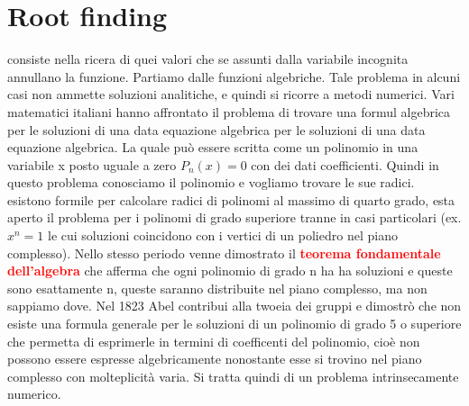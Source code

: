 \section{Root finding}
consiste nella ricera di quei valori che se assunti dalla variabile incognita annullano la funzione. Partiamo dalle funzioni algebriche. Tale problema in alcuni casi non ammette soluzioni analitiche, e quindi si ricorre a metodi numerici. Vari matematici italiani hanno affrontato il problema di trovare una formul algebrica per le soluzioni di una data equazione algebrica per le soluzioni di una data equazione algebrica. La quale può essere scritta come un polinomio in una variabile x posto uguale a zero $P_n(x)=0$ con dei dati coefficienti.
Quindi in questo problema conosciamo il polinomio e vogliamo trovare le sue radici. esistono formile per calcolare radici di polinomi al massimo di quarto grado, esta aperto il problema per i polinomi di grado superiore tranne in casi particolari (ex. $x^n=1$ le cui soluzioni coincidono con i vertici di un poliedro nel piano complesso). Nello stesso periodo venne dimostrato il \textcolor{red}{\textbf{teorema fondamentale dell'algebra}} che afferma che ogni polinomio di grado n ha ha soluzioni e queste sono esattamente n, queste saranno distribuite nel piano complesso, ma non sappiamo dove.
Nel 1823 Abel contribui alla twoeia dei gruppi e dimostrò che non esiste una formula generale per le soluzioni di un polinomio di grado 5 o superiore che permetta di esprimerle in termini di coefficenti del polinomio, cioè non possono essere espresse algebricamente nonostante esse si trovino nel piano complesso con molteplicità varia. Si tratta quindi di un problema intrinsecamente numerico.



